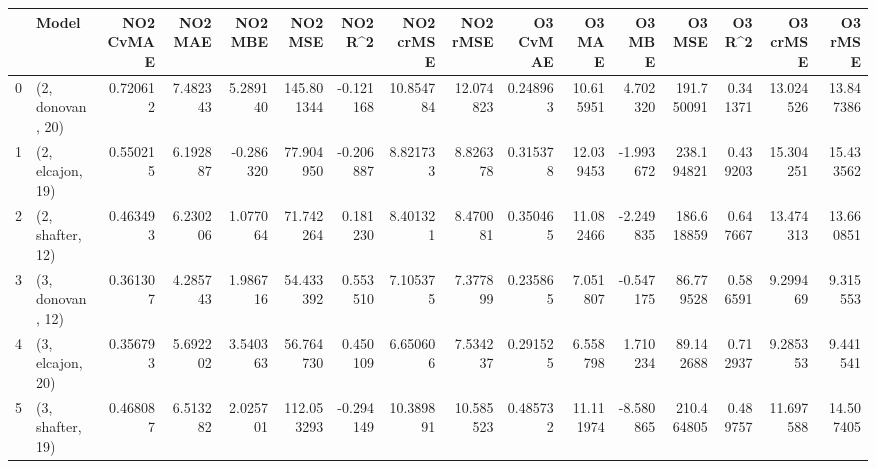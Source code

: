 \begin{tabular}{llrrrrrrrrrrrrrr}
\toprule
{} &             Model &  NO2 CvMAE &   NO2 MAE &   NO2 MBE &     NO2 MSE &   NO2 R\textasciicircum2 &  NO2 crMSE &   NO2 rMSE &  O3 CvMAE &     O3 MAE &    O3 MBE &      O3 MSE &    O3 R\textasciicircum2 &   O3 crMSE &    O3 rMSE \\
\midrule
0 &  (2, donovan, 20) &   0.720612 &  7.482343 &  5.289140 &  145.801344 & -0.121168 &  10.854784 &  12.074823 &  0.248963 &  10.615951 &  4.702320 &  191.750091 &  0.341371 &  13.024526 &  13.847386 \\
1 &  (2, elcajon, 19) &   0.550215 &  6.192887 & -0.286320 &   77.904950 & -0.206887 &   8.821733 &   8.826378 &  0.315378 &  12.039453 & -1.993672 &  238.194821 &  0.439203 &  15.304251 &  15.433562 \\
2 &  (2, shafter, 12) &   0.463493 &  6.230206 &  1.077064 &   71.742264 &  0.181230 &   8.401321 &   8.470081 &  0.350465 &  11.082466 & -2.249835 &  186.618859 &  0.647667 &  13.474313 &  13.660851 \\
3 &  (3, donovan, 12) &   0.361307 &  4.285743 &  1.986716 &   54.433392 &  0.553510 &   7.105375 &   7.377899 &  0.235865 &   7.051807 & -0.547175 &   86.779528 &  0.586591 &   9.299469 &   9.315553 \\
4 &  (3, elcajon, 20) &   0.356793 &  5.692202 &  3.540363 &   56.764730 &  0.450109 &   6.650606 &   7.534237 &  0.291525 &   6.558798 &  1.710234 &   89.142688 &  0.712937 &   9.285353 &   9.441541 \\
5 &  (3, shafter, 19) &   0.468087 &  6.513282 &  2.025701 &  112.053293 & -0.294149 &  10.389891 &  10.585523 &  0.485732 &  11.111974 & -8.580865 &  210.464805 &  0.489757 &  11.697588 &  14.507405 \\
\bottomrule
\end{tabular}
